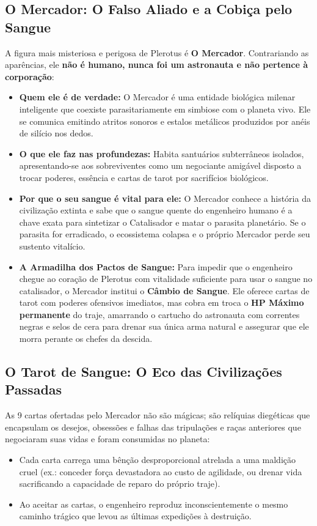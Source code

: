 \documentclass[a4paper,12pt]{report}
\begin{document}
\subsection{O Mercador: O Falso Aliado e a Cobiça pelo Sangue}
A figura mais misteriosa e perigosa de Plerotus é \textbf{O Mercador}. Contrariando as aparências, ele \textbf{não é humano, nunca foi um astronauta e não pertence à corporação}:
\begin{itemize}
    \item \textbf{Quem ele é de verdade:} O Mercador é uma entidade biológica milenar inteligente que coexiste parasitariamente em simbiose com o planeta vivo. Ele se comunica emitindo atritos sonoros e estalos metálicos produzidos por anéis de silício nos dedos.
    \item \textbf{O que ele faz nas profundezas:} Habita santuários subterrâneos isolados, apresentando-se aos sobreviventes como um negociante amigável disposto a trocar poderes, essência e cartas de tarot por sacrifícios biológicos.
    \item \textbf{Por que o seu sangue é vital para ele:} O Mercador conhece a história da civilização extinta e sabe que o sangue quente do engenheiro humano é a chave exata para sintetizar o Catalisador e matar o parasita planetário. Se o parasita for erradicado, o ecossistema colapsa e o próprio Mercador perde seu sustento vitalício.
    \item \textbf{A Armadilha dos Pactos de Sangue:} Para impedir que o engenheiro chegue ao coração de Plerotus com vitalidade suficiente para usar o sangue no catalisador, o Mercador institui o \textbf{Câmbio de Sangue}. Ele oferece cartas de tarot com poderes ofensivos imediatos, mas cobra em troca o \textbf{HP Máximo permanente} do traje, amarrando o cartucho do astronauta com correntes negras e selos de cera para drenar sua única arma natural e assegurar que ele morra perante os chefes da descida.
\end{itemize}

\subsection{O Tarot de Sangue: O Eco das Civilizações Passadas}
As 9 cartas ofertadas pelo Mercador não são mágicas; são relíquias diegéticas que encapsulam os desejos, obsessões e falhas das tripulações e raças anteriores que negociaram suas vidas e foram consumidas no planeta:
\begin{itemize}
    \item Cada carta carrega uma bênção desproporcional atrelada a uma maldição cruel (ex.: conceder força devastadora ao custo de agilidade, ou drenar vida sacrificando a capacidade de reparo do próprio traje).
    \item Ao aceitar as cartas, o engenheiro reproduz inconscientemente o mesmo caminho trágico que levou as últimas expedições à destruição.
\end{itemize}
\end{document}

